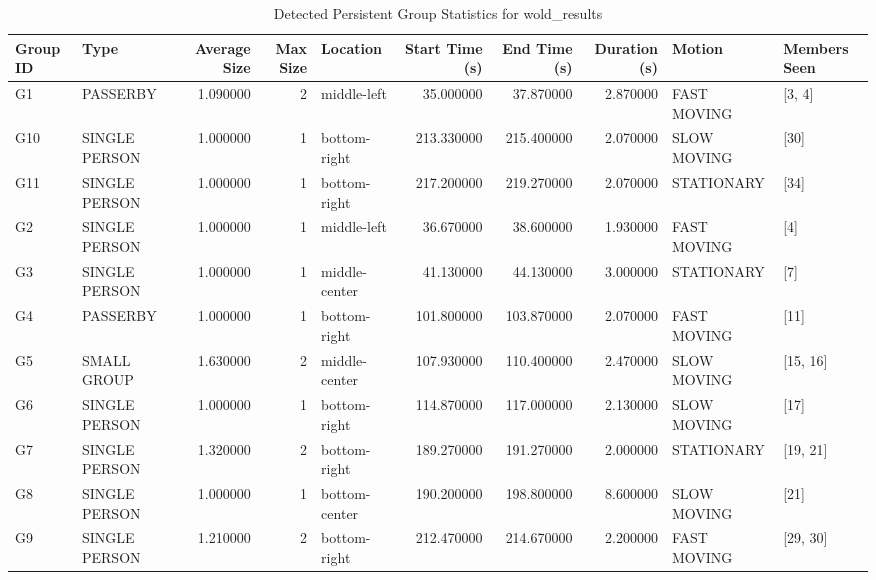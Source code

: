 \begin{table}
\caption{Detected Persistent Group Statistics for wold_results}
\label{tab:wold_results_group_statistics}
\begin{tabular}{llrrlrrrll}
\toprule
Group ID & Type & Average Size & Max Size & Location & Start Time (s) & End Time (s) & Duration (s) & Motion & Members Seen \\
\midrule
G1 & PASSERBY & 1.090000 & 2 & middle-left & 35.000000 & 37.870000 & 2.870000 & FAST MOVING & [3, 4] \\
G10 & SINGLE PERSON & 1.000000 & 1 & bottom-right & 213.330000 & 215.400000 & 2.070000 & SLOW MOVING & [30] \\
G11 & SINGLE PERSON & 1.000000 & 1 & bottom-right & 217.200000 & 219.270000 & 2.070000 & STATIONARY & [34] \\
G2 & SINGLE PERSON & 1.000000 & 1 & middle-left & 36.670000 & 38.600000 & 1.930000 & FAST MOVING & [4] \\
G3 & SINGLE PERSON & 1.000000 & 1 & middle-center & 41.130000 & 44.130000 & 3.000000 & STATIONARY & [7] \\
G4 & PASSERBY & 1.000000 & 1 & bottom-right & 101.800000 & 103.870000 & 2.070000 & FAST MOVING & [11] \\
G5 & SMALL GROUP & 1.630000 & 2 & middle-center & 107.930000 & 110.400000 & 2.470000 & SLOW MOVING & [15, 16] \\
G6 & SINGLE PERSON & 1.000000 & 1 & bottom-right & 114.870000 & 117.000000 & 2.130000 & SLOW MOVING & [17] \\
G7 & SINGLE PERSON & 1.320000 & 2 & bottom-right & 189.270000 & 191.270000 & 2.000000 & STATIONARY & [19, 21] \\
G8 & SINGLE PERSON & 1.000000 & 1 & bottom-center & 190.200000 & 198.800000 & 8.600000 & SLOW MOVING & [21] \\
G9 & SINGLE PERSON & 1.210000 & 2 & bottom-right & 212.470000 & 214.670000 & 2.200000 & FAST MOVING & [29, 30] \\
\bottomrule
\end{tabular}
\end{table}
